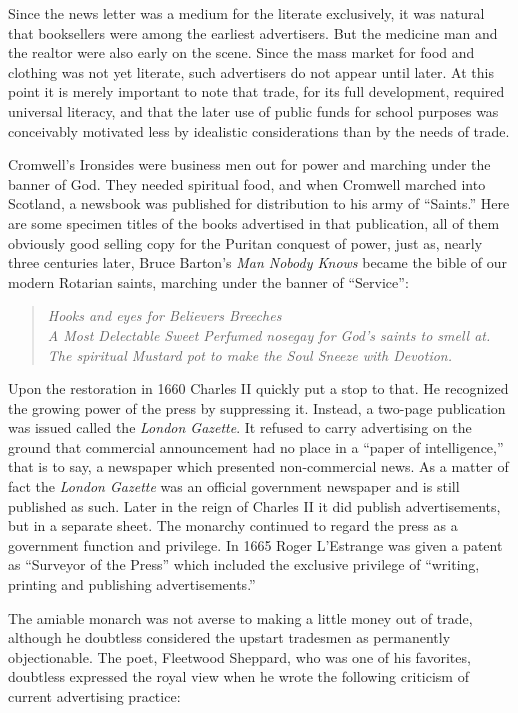 \documentclass[openany,nobib]{tufte-book}
\begin{document}
Since the news letter was a medium for the literate exclusively, it was
natural that booksellers were among the earliest advertisers. But the
medicine man and the realtor were also early on the scene. Since the
mass market for food and clothing was not yet literate, such advertisers
do not appear until later. At this point it is merely important to note
that trade, for its full development, required universal literacy, and
that the later use of public funds for school purposes was conceivably
motivated less by idealistic considerations than by the needs of trade.

Cromwell's Ironsides were business men out for power and marching under
the banner of God. They needed spiritual food, and when Cromwell marched
into Scotland, a newsbook was published for distribution to his army of
``Saints.'' Here are some specimen titles of the books advertised in
that publication, all of them obviously good selling copy for the
Puritan conquest of power, just as, nearly three centuries later, Bruce
Barton's \emph{Man Nobody Knows} became the bible of our modern Rotarian
saints, marching under the banner of ``Service'':

\begin{quote}
\emph{Hooks and eyes for Believers Breeches}\\
\emph{A Most Delectable Sweet Perfumed nosegay for God's saints to smell
at.}\\
\emph{The spiritual Mustard pot to make the Soul Sneeze with Devotion.}
\end{quote}

Upon the restoration in 1660 Charles II quickly put a stop to that. He
recognized the growing power of the press by suppressing it. Instead, a
two-page publication was issued called the \emph{London Gazette}. It
refused to carry advertising on the ground that commercial announcement
had no place in a ``paper of intelligence,'' that is to say, a newspaper
which presented non-commercial news. As a matter of fact the
\emph{London Gazette} was an official government newspaper and is still
published as such. Later in the reign of Charles II it did publish
advertisements, but in a separate sheet. The monarchy continued to
regard the press as a government function and privilege. In 1665 Roger
L'Estrange was given a patent as ``Surveyor of the Press'' which
included the exclusive privilege of ``writing, printing and publishing
advertisements.''

The amiable monarch was not averse to making a little money out of
trade, although he doubtless considered the upstart tradesmen as
permanently objectionable. The poet, Fleetwood Sheppard, who was one of
his favorites, doubtless expressed the royal view when he wrote the
following criticism of current advertising practice:
\end{document}
